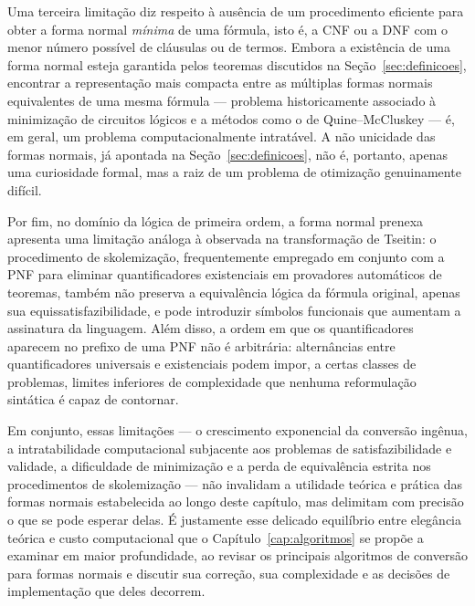 \documentclass[12pt,a4paper,oneside]{report}
\theoremstyle{tituloplain}
\theoremstyle{titulodef}
\begin{document}
Uma terceira limitação diz respeito à ausência de um procedimento eficiente para obter a forma normal \textit{mínima} de uma fórmula, isto é, a CNF ou a DNF com o menor número possível de cláusulas ou de termos. Embora a existência de uma forma normal esteja garantida pelos teoremas discutidos na Seção~\ref{sec:definicoes}, encontrar a representação mais compacta entre as múltiplas formas normais equivalentes de uma mesma fórmula — problema historicamente associado à minimização de circuitos lógicos e a métodos como o de Quine--McCluskey — é, em geral, um problema computacionalmente intratável. A não unicidade das formas normais, já apontada na Seção~\ref{sec:definicoes}, não é, portanto, apenas uma curiosidade formal, mas a raiz de um problema de otimização genuinamente difícil.
 
Por fim, no domínio da lógica de primeira ordem, a forma normal prenexa apresenta uma limitação análoga à observada na transformação de Tseitin: o procedimento de skolemização, frequentemente empregado em conjunto com a PNF para eliminar quantificadores existenciais em provadores automáticos de teoremas, também não preserva a equivalência lógica da fórmula original, apenas sua equissatisfazibilidade, e pode introduzir símbolos funcionais que aumentam a assinatura da linguagem. Além disso, a ordem em que os quantificadores aparecem no prefixo de uma PNF não é arbitrária: alternâncias entre quantificadores universais e existenciais podem impor, a certas classes de problemas, limites inferiores de complexidade que nenhuma reformulação sintática é capaz de contornar.
 
Em conjunto, essas limitações — o crescimento exponencial da conversão ingênua, a intratabilidade computacional subjacente aos problemas de satisfazibilidade e validade, a dificuldade de minimização e a perda de equivalência estrita nos procedimentos de skolemização — não invalidam a utilidade teórica e prática das formas normais estabelecida ao longo deste capítulo, mas delimitam com precisão o que se pode esperar delas. É justamente esse delicado equilíbrio entre elegância teórica e custo computacional que o Capítulo~\ref{cap:algoritmos} se propõe a examinar em maior profundidade, ao revisar os principais algoritmos de conversão para formas normais e discutir sua correção, sua complexidade e as decisões de implementação que deles decorrem.

\end{document}
